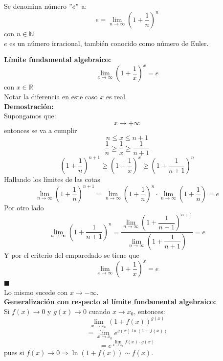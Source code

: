 \documentclass[10pt,twoside]{SelfArx} %
\begin{document}
\begin{thm}
	Se denomina número $ "e" $ a:
	\[ e=\lim\limits_{n\rightarrow\infty}\left (1+\dfrac{1}{n}\right )^{n} \]
	con $ n\in\mathbb{N} $\\
	$ e $ es un número irracional, también conocido como número de Euler.
	
\end{thm}
\textbf{Límite fundamental algebraico:}\\
	\[ \lim\limits_{x\rightarrow\infty}\left (1+\dfrac{1}{x}\right )^{x}=e \]
	con $ x\in\mathbb{R} $\\
\textsf{Notar la diferencia en este caso $ x $ es real.}\\
\textbf{Demostración:}\\
Supongamos que:
\[ x\rightarrow+\infty \]
entonces se va a cumplir
\[ n\leq x\leq n+1 \]
\[ \dfrac{1}{n}\geq\dfrac{1}{x}\geq\dfrac{1}{n+1} \]
\begin{equation}
\left ( 1+\dfrac{1}{n}\right )^{n+1}
\geq \left ( 1+\dfrac{1}{x}\right )^{x}
\geq \left ( 1+\dfrac{1}{n+1}\right )^{n}
\end{equation}
Hallando los límites de las cotas
\begin{equation}
\lim\limits_{n\rightarrow\infty}\left ( 1+\dfrac{1}{n}\right )^{n+1}
=\lim\limits_{n\rightarrow\infty}\left ( 1+\dfrac{1}{n}\right )^{n}\cdot\lim\limits_{n\rightarrow\infty}\left ( 1+\dfrac{1}{n}\right )
=e
\end{equation}
Por otro lado
\begin{equation}
\lim\limits_{n\rightarrow\infty}\left ( 1+\dfrac{1}{n+1}\right )^{n}
=\dfrac{\lim\limits_{n\rightarrow\infty}\left ( 1+\dfrac{1}{n+1}\right )^{n+1}}{\lim\limits_{n\rightarrow\infty}\left ( 1+\dfrac{1}{n+1}\right )}
=e
\end{equation}
Y por el criterio del emparedado se tiene que 
	\[ \lim\limits_{x\rightarrow\infty}\left (1+\dfrac{1}{x}\right )^{x}=e \]
	$ \blacksquare $
	\\
	Lo mismo sucede con $ x\rightarrow-\infty. $\\


\textbf{Generalización con respecto al límite fundamental algebraico:}\\
Si $ f(x) \rightarrow0 $ y $ g(x)\rightarrow0 $ cuando $ x\rightarrow x_{0} $, entonces:
\[ \lim\limits_{x\rightarrow x_{0}}\left (1+f(x)\right )^{g(x)}  \]
\[ =\lim\limits_{x\rightarrow x_{0}}e^{g(x)\ln(1+f(x))} \]
\[ =e^{\lim\limits_{x\rightarrow x_{0}}f(x)\cdot g(x)} \]
pues si $ f(x)\rightarrow0\Rightarrow\ln(1+f(x))\sim f(x) $.
\end{document}
